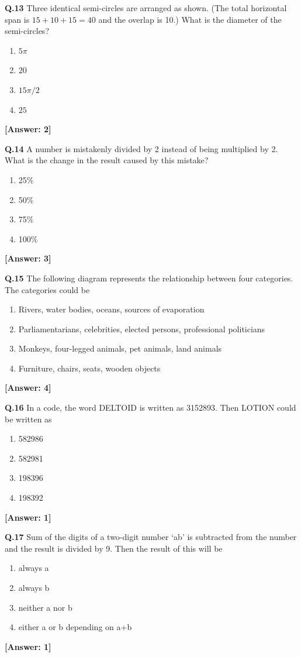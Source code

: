 \documentclass[12pt,a4paper]{article}
\newcommand{\ans}[1]{\quad\textcolor{anscolor}{\textbf{[Answer: #1]}}}
\begin{document}
\textbf{Q.13} Three identical semi-circles are arranged as shown. (The total horizontal span is $15+10+15=40$ and the overlap is 10.) What is the diameter of the semi-circles?
\begin{enumerate}[label=\arabic*.]
\item $5\pi$ \item $20$ \item $15\pi/2$ \item $25$
\end{enumerate}\ans{2}

\textbf{Q.14} A number is mistakenly divided by 2 instead of being multiplied by 2. What is the change in the result caused by this mistake?
\begin{enumerate}[label=\arabic*.]
\item 25\% \item 50\% \item 75\% \item 100\%
\end{enumerate}\ans{3}

\textbf{Q.15} The following diagram represents the relationship between four categories. The categories could be
\begin{enumerate}[label=\arabic*.]
\item Rivers, water bodies, oceans, sources of evaporation
\item Parliamentarians, celebrities, elected persons, professional politicians
\item Monkeys, four-legged animals, pet animals, land animals
\item Furniture, chairs, seats, wooden objects
\end{enumerate}\ans{4}

\textbf{Q.16} In a code, the word DELTOID is written as 3152893. Then LOTION could be written as
\begin{enumerate}[label=\arabic*.]
\item 582986 \item 582981 \item 198396 \item 198392
\end{enumerate}\ans{1}

\textbf{Q.17} Sum of the digits of a two-digit number `ab' is subtracted from the number and the result is divided by 9. Then the result of this will be
\begin{enumerate}[label=\arabic*.]
\item always a \item always b \item neither a nor b \item either a or b depending on a+b
\end{enumerate}\ans{1}
\end{document}
